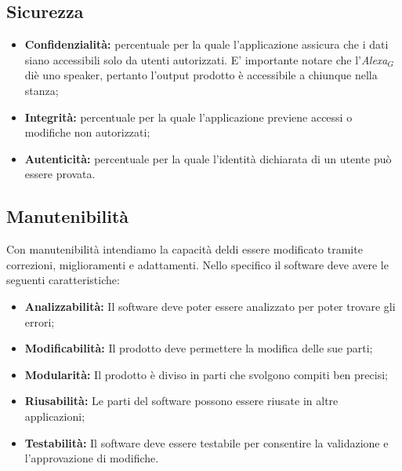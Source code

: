 \subsection{Sicurezza}
\begin{itemize}
	\item \textbf{Confidenzialità:} percentuale per la quale l'applicazione assicura che i dati siano accessibili solo da utenti autorizzati. E' importante notare che l'\textit{Alexa$_{G}$} diè uno speaker, pertanto l'output prodotto è accessibile a chiunque nella stanza;
	\item \textbf{Integrità:} percentuale per la quale l'applicazione previene accessi o modifiche non autorizzati;
	\item \textbf{Autenticità:} percentuale per la quale l'identità dichiarata di un utente può essere provata.
\end{itemize}
\subsection{Manutenibilità}
Con manutenibilità intendiamo la capacità deldi essere modificato tramite correzioni, miglioramenti e adattamenti.
Nello specifico il software deve avere le seguenti caratteristiche:
\begin{itemize}
	\item \textbf{Analizzabilità:} Il software deve poter essere analizzato per poter trovare gli errori;
	\item \textbf{Modificabilità:} Il prodotto deve permettere la modifica delle sue parti;
	\item \textbf{Modularità:} Il prodotto è diviso in parti che svolgono compiti ben precisi;
	\item \textbf{Riusabilità:} Le parti del software possono essere riusate in altre applicazioni;
	\item \textbf{Testabilità:} Il software deve essere testabile per consentire la validazione e l'approvazione di modifiche.
\end{itemize}	
	
